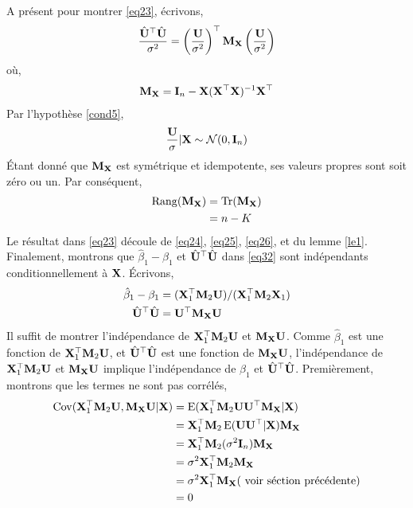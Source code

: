 A présent pour montrer \eqref{eq23}, écrivons,
\begin{align}
\frac{\hat{\mathbf U}^\top\hat{\mathbf U}}{\sigma^2} = \left(\frac{\mathbf U}{\sigma^2}\right)^\top\mathbf M_\mathbf X\left(\frac{\mathbf U}{\sigma^2}\right)
\label{eq24}
\end{align}
où,
\begin{align*}
\mathbf M_\mathbf X=\mathbf{I}_n - \mathbf X(\mathbf X^\top\mathbf X)^{-1}\mathbf X^\top
\end{align*}
Par l'hypothèse \ref{cond5},
\begin{align}
\frac{\mathbf U}{\sigma} | \mathbf X\sim\mathcal{N}(0, \mathbf{I}_n)
\label{eq25}
\end{align}
\'Etant donné que $\mathbf M_\mathbf X$ est symétrique et idempotente, ses valeurs propres sont soit zéro ou un. Par conséquent,
\begin{align}
\mathrm{Rang}(\mathbf M_\mathbf X) &= \operatorname{Tr}(\mathbf M_\mathbf X) \nonumber\\
&=n-K
\label{eq26}
\end{align}
Le résultat dans \eqref{eq23} découle de \eqref{eq24},  \eqref{eq25},  \eqref{eq26}, et du lemme \ref{le1}.\\
Finalement, montrons que $\hat{\beta}_1 - \beta_1$ et $\hat{\mathbf U}^\top\hat{\mathbf U}$ dans \eqref{eq32} sont indépendants conditionnellement à $\mathbf X$. \'Ecrivons,
\begin{align*}
\hat{\beta}_1-\beta_1 &= (\mathbf X_1^\top\mathbf M_2\mathbf U)/(\mathbf X_1^\top\mathbf M_2\mathbf X_1)\\
\hat{\mathbf U}^\top\hat{\mathbf U}&=\mathbf U^\top\mathbf M_\mathbf X\mathbf U
\end{align*}
Il suffit de montrer l'indépendance de $\mathbf X_1^\top\mathbf M_2\mathbf U$ et  $\mathbf M_\mathbf X\mathbf U$. Comme $\hat{\beta}_1$ est une fonction de $\mathbf X_1^\top\mathbf M_2\mathbf U$, et $\hat{\mathbf U}^\top\hat{\mathbf U}$ est une fonction de $\mathbf M_\mathbf X\mathbf U$, l'indépendance de $\mathbf X_1^\top\mathbf M_2\mathbf U$ et  $\mathbf M_\mathbf X\mathbf U$ implique l'indépendance de $\hat{\beta}_1$ et $\hat{\mathbf U}^\top\hat{\mathbf U}$. Premièrement, montrons que les termes ne sont pas corrélés,
\begin{align*}
\operatorname{Cov}(\mathbf X_1^\top\mathbf M_2\mathbf U, \mathbf M_\mathbf X\mathbf U | \mathbf X) &=\operatorname{E}(\mathbf X_1^\top\mathbf M_2\mathbf U\mathbf U^\top \mathbf M_\mathbf X|\mathbf X)\\
&=\mathbf X_1^\top\mathbf M_2\operatorname{E}(\mathbf U\mathbf U^\top|\mathbf X)\mathbf M_\mathbf X\\
&=\mathbf X_1^\top\mathbf M_2(\sigma^2\mathbf{I}_n)\mathbf M_\mathbf X\\
&=\sigma^2\mathbf X_1^\top\mathbf M_2\mathbf M_\mathbf X\\
&=\sigma^2\mathbf X_1^\top\mathbf M_\mathbf X( \ \textrm{voir séction précédente})\\
&=0
\end{align*}
